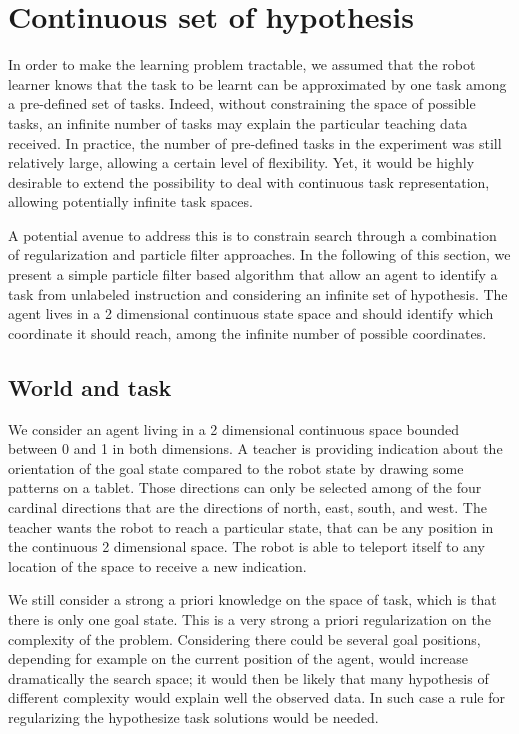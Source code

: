 
\section{Continuous set of hypothesis}
\label{chapter:limitations:continuoushypothesis}


In order to make the learning problem tractable, we assumed that the robot learner knows that the task to be learnt can be approximated by one task among a pre-defined set of tasks. Indeed, without constraining the space of possible tasks, an infinite number of tasks may explain the particular teaching data received. In practice, the number of pre-defined tasks in the experiment was still relatively large, allowing a certain level of flexibility. Yet, it would be highly desirable to extend the possibility to deal with continuous task representation, allowing potentially infinite task spaces. 

A potential avenue to address this is to constrain search through a combination of regularization and particle filter approaches. In the following of this section, we present a simple particle filter based algorithm that allow an agent to identify a task from unlabeled instruction and considering an infinite set of hypothesis. The agent lives in a 2 dimensional continuous state space and should identify which  coordinate it should reach, among the infinite number of possible coordinates.

\subsection{World and task}

We consider an agent living in a 2 dimensional continuous space bounded between 0 and 1 in both dimensions. A teacher is providing indication about the orientation of the goal state compared to the robot state by drawing some patterns on a tablet. Those directions can only be selected among of the four cardinal directions that are the directions of north, east, south, and west. The teacher wants the robot to reach a particular state, that can be any position in the continuous 2 dimensional space. The robot is able to teleport itself to any location of the space to receive a new indication.

We still consider a strong a priori knowledge on the space of task, which is that there is only one goal state. This is a very strong a priori regularization on the complexity of the problem. Considering there could be several goal positions, depending for example on the current position of the agent, would increase dramatically the search space; it would then be likely that many hypothesis of different complexity would explain well the observed data. In such case a rule for regularizing the hypothesize task solutions would be needed.

